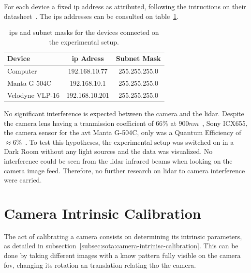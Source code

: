For each device a fixed \ac{ip} address as attributed, following the intructions on their datasheet~\cite{VLP16, MantaVision2013}. The \acp{ip} addresses can be consulted on table~\ref{tab:experimental-setup-ip}.

\begin{table}[H]
	\renewcommand{\arraystretch}{1.2}
	\centering
	\begin{tabular}{@{}lcc@{}}
		\toprule
		Device          & \ac{ip} Adress & Subnet Mask\\ \midrule
		Computer        & 192.168.10.77  & 255.255.255.0 \\
		Manta G-504C    & 192.168.10.1   & 255.255.255.0 \\
		Velodyne VLP-16 & 192.168.10.201 & 255.255.255.0 \\
		\bottomrule
	\end{tabular}
	\label{tab:experimental-setup-ip}
	\caption{\acp{ip} and subnet masks for the devices connected on the experimental setup.}
\end{table}

No significant interference is expected between the camera and the \ac{lidar}. Despite the camera lens having a tranmission coefficient of $66\%$ at $900 nm$~\cite{Thorlabs}, Sony ICX655, the camera sensor for the \ac{avt} Manta G-504C, only was a Quantum Efficiency of $\approx 6\%$~\cite{MantaG504C}. To test this hypotheses, the experimental setup was switched on in a Dark Room without any light sources and the data was visualized. No interference could be seen from the \ac{lidar} infrared beams when looking on the camera image feed. Therefore, no further research on \ac{lidar} to camera interference were carried. 





\section{Camera Intrinsic Calibration}
The act of calibrating a camera consists on determining its intrinsic parameters, as detailed in subsection~\ref{subsec:sota:camera-intrinisc-calibration}. This can be done by taking different images with a know pattern fully visible on the camera \ac{fov}, changing its rotation an translation relating tho the camera.

